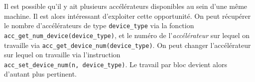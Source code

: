 \documentclass{article}
\begin{document}
Il est possible qu'il y ait plusieurs accélérateurs disponibles au sein d'une même machine. Il est alors intéressant d'exploiter cette opportunité. On peut récupérer le nombre d'accélérateurs de type \texttt{device\_type} via la fonction \\ \texttt{acc\_get\_num\_device(device\_type)}, et le numéro de l'\textit{accélérateur} sur lequel on travaille via \texttt{acc\_get\_device\_num(device\_type)}. On peut changer l'accélérateur sur lequel on travaille via l'instruction \\ \texttt{acc\_set\_device\_num(n, device\_type)}. Le travail par bloc devient alors d'autant plus pertinent.

\newpage



\listoffigures

\newpage



\end{document}
